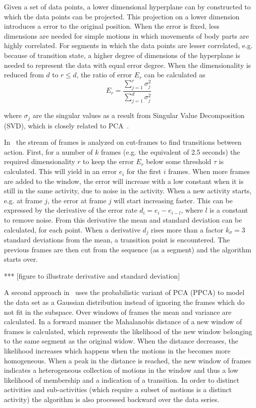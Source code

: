 Given a set of data points, a lower dimensional hyperplane can by constructed to which the data points can be projected.
This projection on a lower dimension introduces a error to the original position.
When the error is fixed, less dimensions are needed for simple motions in which movements of body parts are highly correlated.
For segments in which the data points are lesser correlated, e.g. because of transition state, a higher degree of dimensions of the hyperplane is needed to represent the data with equal error degree.
When the dimensionality is reduced from $d$ to $r \le d$, the ratio of error $E_r$ can be calculated as
\begin{equation}
	E_r = \frac{\sum_{j=1}^{r} \sigma_j^2}{\sum_{j=1}^{d} \sigma_j^2}
\end{equation}

where $\sigma_j$ are the singular values as a result from Singular Value Decomposition (SVD), which is closely related to PCA~\cite{shlens2005tutorial}.

In~\cite{barbivc2004segmenting} the stream of frames is analyzed on cut-frames to find transitions between action.
First, for a number of $k$ frames (e.g. the equivalent of 2.5 seconds) the required dimensionality $r$ to keep the error $E_r$ below some threshold $\tau$ is calculated.
This will yield in an error $e_i$ for the first $i$ frames.
When more frames are added to the window, the error will increase with a low constant when it is still in the same activity, due to noise in the activity.
When a new activity starts, e.g. at frame $j$, the error at frame $j$ will start increasing faster.
This can be expressed by the derivative of the error rate $d_i = e_i - e_{i-l}$, where $l$ is a constant to remove noise.
From this derivative the mean and standard deviation can be calculated, for each point.
When a derivative $d_j$ rises more than a factor $k_\sigma = 3$ standard deviations from the mean, a transition point is encountered.
The previous frames are then cut from the sequence (as a segment) and the algorithm starts over.

*** [figure to illustrate derivative and standard deviation]

A second approach in~\cite{barbivc2004segmenting} uses the probabilistic variant of PCA (PPCA) to model the data set as a Gaussian distribution instead of ignoring the frames which do not fit in the subspace.
Over windows of frames the mean and variance are calculated.
In a forward manner the Mahalanobis distance of a new window of frames is calculated, which represents the likelihood of the new window belonging to the same segment as the original widow.
When the distance decreases, the likelihood increases which happens when the motions in the becomes more homogeneous.
When a peak in the distance is reached, the new window of frames indicates a heterogeneous collection of motions in the window and thus a low likelihood of membership and a indication of a transition.
In order to distinct activities and sub-activities (which require a subset of motions is a distinct activity) the algorithm is also processed backward over the data series.

